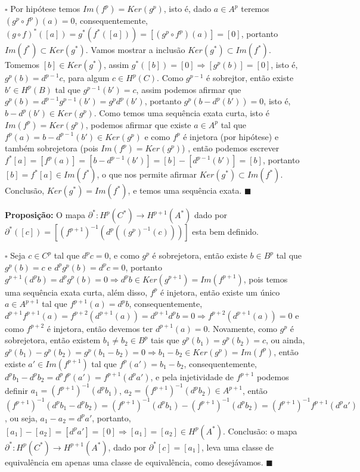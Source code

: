 \documentclass{article}
\begin{document}
	$\square$ Por hipótese temos $Im(f^{p}) = Ker(g^{p})$, isto é, dado $a \in A^{p}$ teremos $(g^{p}\circ f^{p})(a) = 0$, consequentemente, $(g\circ f)^{*}([a]) = g^{*}(f^{*}([a])) = [(g^{p}\circ f^{p})(a)] = [0]$, portanto $Im(f^{*}) \subset Ker(g^{*})$. Vamos mostrar a inclusão $Ker(g^{*}) \subset Im(f^{*})$. Tomemos $[b] \in Ker(g^{*})$, assim $g^{*}([b]) = [0] \Rightarrow [g^{p}(b)] = [0]$, isto é, $g^{p}(b) = d^{p-1}c$, para algum $c \in H^{p}(C)$. Como $g^{p-1}$ é sobrejtor, então existe $b' \in H^{p}(B)$ tal que $g^{p-1}(b') = c$, assim podemos afirmar que $g^{p}(b) = d^{p-1}g^{p-1}(b') = g^{p}d^{p}(b')$, portanto $g^{p}(b - d^{p}(b')) = 0$, isto é, $b - d^{p}(b') \in Ker(g^{p})$. Como temos uma sequência exata curta, isto é $Im(f^{p}) = Ker(g^{p})$, podemos afirmar que existe $a \in A^{p}$ tal que $f^{p}(a) = b - d^{p-1}(b') \in Ker(g^{p})$ e como $f^{p}$ é injetora (por hipótese) e também sobrejetora (pois $Im(f^{p}) = Ker(g^{p})$) , então podemos escrever $f^{*}[a] = [f^{p}(a)] = [b - d^{p-1}(b')] =  [b] - [d^{p-1}(b')] = [b]$, portanto $[b] = f^{*}[a] \in Im(f^{*})$, o que nos permite afirmar $Ker(g^{*}) \subset Im(f^{*})$. Conclusão, $Ker(g^{*}) = Im(f^{*})$, e temos uma sequência exata. $\blacksquare$

	\textbf{Proposição:} O mapa $\partial^{*}: H^{p}(C^{*}) \to H^{p+1}(A^{*})$ dado por $\partial^{*}([c]) = [(f^{p+1})^{-1}(d^{p}((g^{p})^{-1}(c)))] $ esta bem definido.
	
	$\square$ Seja $c \in C^{p}$ tal que $d^{p}c=0$, e como $g^{p}$ é sobrejetora, então existe $b \in B^{p}$ tal que $g^{p}(b) = c$ e $d^{p}g^{p}(b) = d^{p}c = 0$, portanto $g^{p+1}(d^{p}b) = d^{p}g^{p}(b) = 0 \Rightarrow d^{p}b \in Ker(g^{p+1}) = Im(f^{p+1})$, pois temos uma sequência exata curta, além disso, $f^{p}$ é injetora, então existe um único $a \in A^{p+1}$ tal que $f^{p+1}(a) = d^{p}b$, consequentemente, $d^{p+1}f^{p+1}(a) = f^{p+2}(d^{p+1}(a))=d^{p+1}d^{p}b=0 \Rightarrow f^{p+2}(d^{p+1}(a)) =0$ e como $f^{p+2}$ é injetora, então devemos ter $d^{p+1}(a)=0$. Novamente, como $g^{p}$ é sobrejetora, então existem $b_{1} \neq b_{2} \in B^{p}$ tais que $g^{p}(b_{1}) = g^{p}(b_{2}) = c$, ou ainda, $g^{p}(b_{1}) - g^{p}(b_{2}) = g^{p}(b_{1}-b_{2}) = 0 \Rightarrow b_{1}-b_{2} \in Ker(g^{p}) = Im(f^{p})$, então existe $a' \in Im(f^{p+1})$ tal que $f^{p}(a') = b_{1}-b_{2}$, consequentemente, $d^{p}b_{1} - d^{p}b_{2} = d^{p}f^{p}(a') = f^{p+1}(d^{p}a')$, e pela injetividade de $f^{p+1}$ podemos definir $a_{1} = (f^{p+1})^{-1}(d^{p}b_{1})$, $ a_{2} = (f^{p+1})^{-1}(d^{p}b_{2}) \in A^{p+1}$, então $(f^{p+1})^{-1}(d^{p}b_{1} - d^{p}b_{2}) =(f^{p+1})^{-1}(d^{p}b_{1}) - (f^{p+1})^{-1}(d^{p}b_{2})  = (f^{p+1})^{-1}f^{p+1}(d^{p}a')$, ou seja, $a_{1} - a_{2} = d^{p}a'$, portanto, $[a_{1}] - [a_{2}] = [d^{p}a'] = [0] \Rightarrow [a_{1}] = [a_{2}] \in H^{p}(A^{*})$. Conclusão: o mapa $\partial^{*}: H^{p}(C^{*}) \to H^{p+1}(A^{*})$, dado por $\partial^{*}[c] = [a_{1}]$, leva uma classe de equivalência em apenas uma classe de equivalência, como desejávamos. $\blacksquare$
	
\end{document}
